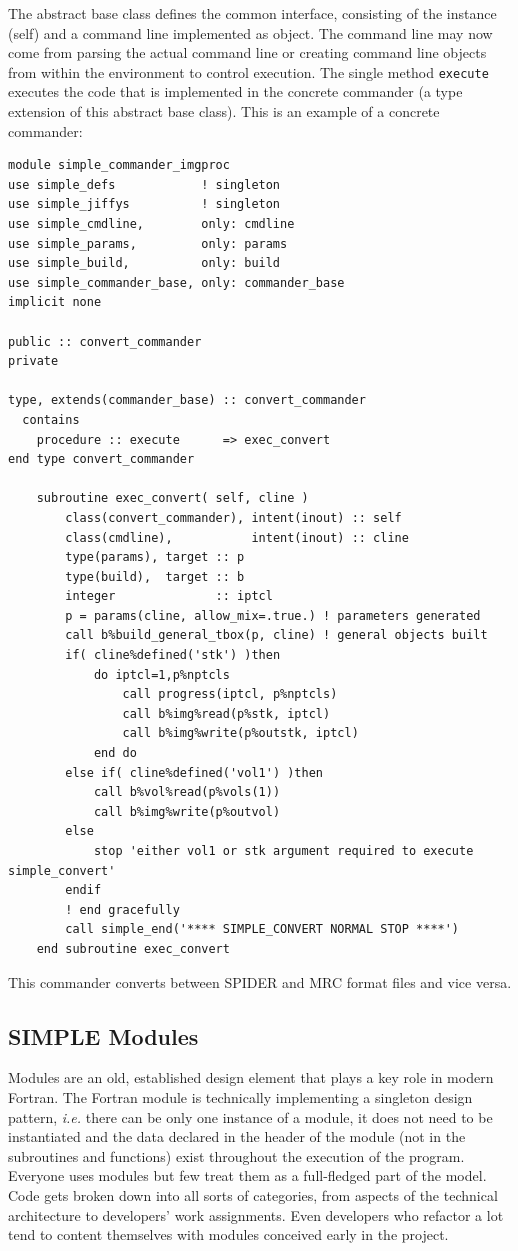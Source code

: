 \documentclass[a4paper,11pt]{article}
\begin{document}
The abstract base class defines the common interface, consisting of the instance (self) and a command line implemented as object. The command line may now come from parsing the actual command line or creating command line objects from within the environment to control execution. The single method \texttt{execute} executes the code that is implemented in the concrete commander (a type extension of this abstract base class). This is an example of a concrete commander:
\begin{verbatim}
module simple_commander_imgproc
use simple_defs            ! singleton
use simple_jiffys          ! singleton
use simple_cmdline,        only: cmdline
use simple_params,         only: params
use simple_build,          only: build
use simple_commander_base, only: commander_base
implicit none

public :: convert_commander
private

type, extends(commander_base) :: convert_commander
  contains
    procedure :: execute      => exec_convert
end type convert_commander

    subroutine exec_convert( self, cline )
        class(convert_commander), intent(inout) :: self
        class(cmdline),           intent(inout) :: cline
        type(params), target :: p
        type(build),  target :: b
        integer              :: iptcl
        p = params(cline, allow_mix=.true.) ! parameters generated
        call b%build_general_tbox(p, cline) ! general objects built
        if( cline%defined('stk') )then
            do iptcl=1,p%nptcls
                call progress(iptcl, p%nptcls)
                call b%img%read(p%stk, iptcl)
                call b%img%write(p%outstk, iptcl)
            end do 
        else if( cline%defined('vol1') )then
            call b%vol%read(p%vols(1))
            call b%img%write(p%outvol)
        else
            stop 'either vol1 or stk argument required to execute simple_convert'
        endif
        ! end gracefully
        call simple_end('**** SIMPLE_CONVERT NORMAL STOP ****')
    end subroutine exec_convert
\end{verbatim}
This commander converts between SPIDER and MRC format files and vice versa.

\subsection{SIMPLE Modules}
Modules are an old, established design element that plays a key role in modern Fortran. The Fortran module is technically implementing a singleton design pattern, \textit{i.e.} there can be only one instance of a module, it does not need to be instantiated and the data declared in the header of the module (not in the subroutines and functions) exist throughout the execution of the program. Everyone uses modules but few treat them as a full-fledged part of the model. Code gets broken down into all sorts of categories, from aspects of the technical architecture to developers' work assignments. Even developers who refactor a lot tend to content themselves with modules conceived early in the project.
\end{document}
